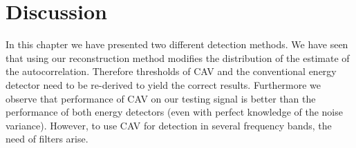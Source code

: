 \documentclass[a4paper, openany, oneside]{memoir}
\begin{document}
\section{Discussion}
In this chapter we have presented two different detection methods. We have seen that using our reconstruction method modifies the 
distribution of the estimate of the autocorrelation. Therefore thresholds of CAV and the conventional energy detector need to be re-derived
to yield the correct results. Furthermore we observe that performance of CAV on our testing signal is better than the performance of both energy 
detectors (even with perfect knowledge of the noise variance). However, to use CAV for detection in several frequency bands, the need of filters arise.

\end{document}
